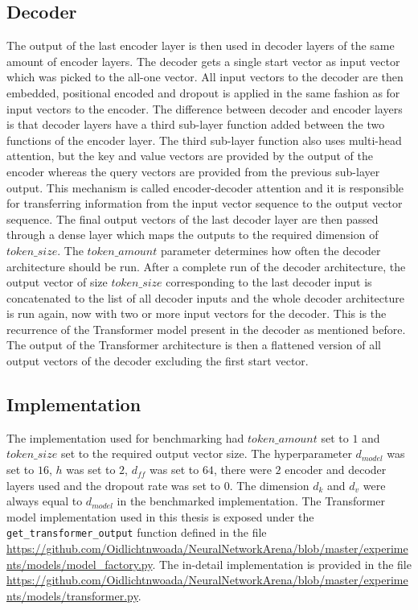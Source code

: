 \documentclass[draft,final]{vutinfth} %
\begin{document}
    \subsection{Decoder}
    The output of the last encoder layer is then used in decoder layers of the same amount of encoder layers.
    The decoder gets a single start vector as input vector which was picked to the all-one vector.
    All input vectors to the decoder are then embedded, positional encoded and dropout is applied in the same fashion as for input vectors to the encoder.
    The difference between decoder and encoder layers is that decoder layers have a third sub-layer function added between the two functions of the encoder layer.
    The third sub-layer function also uses multi-head attention, but the key and value vectors are provided by the output of the encoder whereas the query vectors are provided from the previous sub-layer output.
    This mechanism is called encoder-decoder attention and it is responsible for transferring information from the input vector sequence to the output vector sequence.
    The final output vectors of the last decoder layer are then passed through a dense layer which maps the outputs to the required dimension of $token\_size$.
    The $token\_amount$ parameter determines how often the decoder architecture should be run.
    After a complete run of the decoder architecture, the output vector of size $token\_size$ corresponding to the last decoder input is concatenated to the list of all decoder inputs and the whole decoder architecture is run again, now with two or more input vectors for the decoder.
    This is the recurrence of the Transformer model present in the decoder as mentioned before.
    The output of the Transformer architecture is then a flattened version of all output vectors of the decoder excluding the first start vector.
    \subsection{Implementation}
    The implementation used for benchmarking had $token\_amount$ set to $1$ and $token\_size$ set to the required output vector size.
    The hyperparameter $d_{model}$ was set to $16$, $h$ was set to $2$, $d_{ff}$ was set to $64$, there were $2$ encoder and decoder layers used and the dropout rate was set to $0$.
    The dimension $d_k$ and $d_v$ were always equal to $d_{model}$ in the benchmarked implementation.
    The Transformer model implementation used in this thesis is exposed under the \texttt{get\_transformer\_output} function defined in the file \url{https://github.com/Oidlichtnwoada/NeuralNetworkArena/blob/master/experiments/models/model_factory.py}.
    The in-detail implementation is provided in the file \url{https://github.com/Oidlichtnwoada/NeuralNetworkArena/blob/master/experiments/models/transformer.py}.
\end{document}
